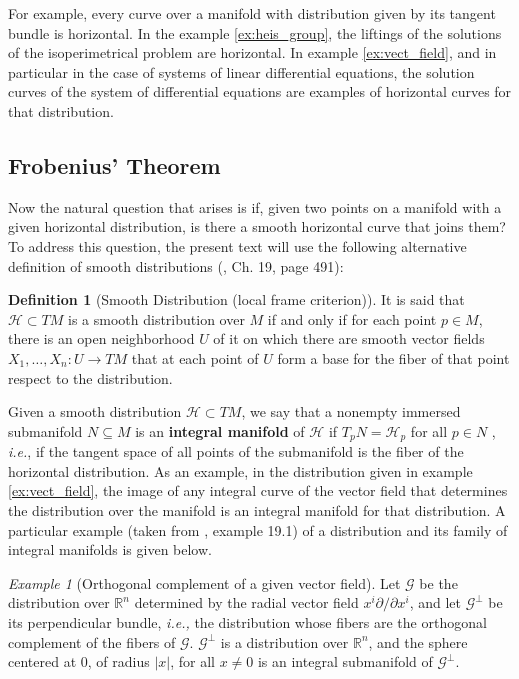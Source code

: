 \documentclass[12pt, letterpaper, reqno]{amsart}
\theoremstyle{definition}
\newtheorem{df}{Definition}
\theoremstyle{plain}
\theoremstyle{remark}
\newtheorem{ex}{Example}
\begin{document}
For example, every curve over a manifold with distribution given by its tangent bundle is horizontal. In the example \ref{ex:heis_group}, the liftings of the solutions of the isoperimetrical problem are horizontal. In example \ref{ex:vect_field}, and in particular in the case of systems of linear differential equations, the solution curves of the system of differential equations are examples of horizontal curves for that distribution.

\subsection{Frobenius' Theorem}%
\label{sub:frobenius_theorem}


Now the natural question that arises is if, given two points on a manifold with a given horizontal distribution, is there a smooth horizontal curve that joins them? To address this question, the present text will use the following alternative definition of smooth distributions (\cite{lee2003introduction}, Ch. 19, page 491): 

\begin{df}[Smooth Distribution (local frame criterion)]
	It is said that $ \mathcal{H}\subset TM $ is a smooth distribution over $M  $ if and only if  for each point $ p\in M $, there is an open neighborhood $ U $ of it on which there are smooth vector fields $ X_1,\dots,X_n: U \rightarrow {TM} $ that at each point of $ U $ form a base for the fiber of that point respect to the distribution.
\end{df}

Given a smooth distribution $ \mathcal{H} \subset TM$, we say that a nonempty immersed submanifold $ N\subseteq M $  is an \textbf{integral manifold} of $\mathcal{H}$ if $ T_p N = \mathcal{H}_p $ for all $ p\in N $ , \textit{i.e.}, if the tangent space of all points of the submanifold is the fiber of the horizontal distribution. As an example, in the distribution given in example \ref{ex:vect_field}, the image of any integral curve of the vector field that determines the distribution over the manifold is an integral manifold for that distribution. A particular example (taken from \cite{lee2003introduction}, example 19.1) of a distribution and its family of integral manifolds is given below.

\begin{ex}[Orthogonal complement of a given vector field]
Let $ \mathcal{G} $ be the distribution over $ \mathbb{R}^n $ determined by the radial vector field $ x^i \partial / \partial x^i $, and let $ \mathcal{G}^\perp $ be its perpendicular bundle, \textit{i.e.,} the distribution whose fibers are the orthogonal complement of the fibers of $ \mathcal{G}. $ $ \mathcal{G}^\perp $ is a distribution over $ \mathbb{R}^n  $, and the sphere centered at $0$, of radius $ |x| $, for all $ x\neq0 $ is an integral submanifold of $ \mathcal{G}^\perp. $        
\end{ex}
\end{document}
